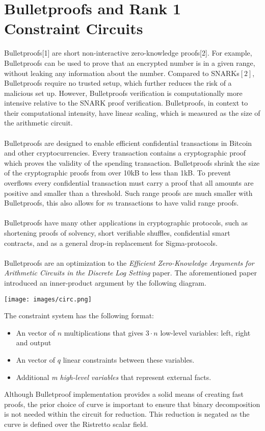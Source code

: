 \documentclass{article}
\begin{document}
\section{Bulletproofs and Rank 1 Constraint Circuits} 
Bulletproofs[1] are short non-interactive zero-knowledge proofs[2]. For example, Bulletproofs can be used to prove that an encrypted number is in a given range, without leaking any information about the number. Compared to SNARKs$[2]$, Bulletproofs require no trusted setup, which further reduces the risk of a malicious set up. However, Bulletproofs verification is computationally more intensive relative to the SNARK proof verification. Bulletproofs, in context to their computational intensity, have linear scaling, which is measured as the size of the arithmetic circuit.\\\\
Bulletproofs are designed to enable efficient confidential transactions in Bitcoin and other cryptocurrencies. Every transaction contains a cryptographic proof which proves the validity of the spending transaction. Bulletproofs shrink the size of the cryptographic proofs from over 10kB to less than 1kB. To prevent overflows every confidential transaction must carry a proof that all amounts are positive and smaller than a threshold. Such range proofs are much smaller with Bulletproofs, this also allows for $m$ transactions to have valid range proofs. \\\\
Bulletproofs have many other applications in cryptographic protocols, such as shortening proofs of solvency, short verifiable shuffles, confidential smart contracts, and as a general drop-in replacement for Sigma-protocols. \\\\
Bulletproofs are an optimization to the \emph{Efficient Zero-Knowledge Arguments for
Arithmetic Circuits in the Discrete Log Setting} paper. The aforementioned paper introduced an inner-product argument by the following diagram.
\begin{center}
\texttt{[image: images/circ.png]}
\end{center}
The constraint system has the following format: 
\begin{itemize}
    \item  An vector of $n$ multiplications that gives $3 \cdot n$ low-level variables: left, right and output
    \item An vector of $q$ linear constraints between these variables.
    \item Additional \emph{m high-level variables} that represent external facts.
\end{itemize} 
 Although Bulletproof implementation provides a solid means of creating fast proofs, the prior choice of curve is important to ensure that binary decomposition is not needed within the circuit for reduction. This reduction is negated as the curve is defined over the Ristretto scalar field.  
\end{document}
